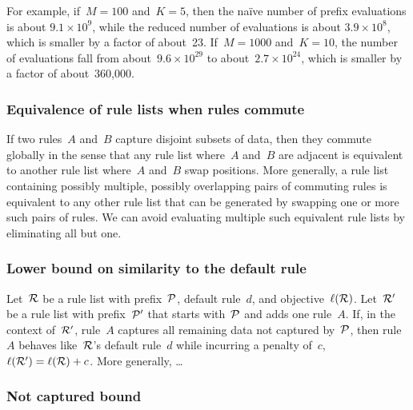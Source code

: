 For example, if~${M = 100}$ and~${K = 5}$, then the na\"ive number of prefix evaluations is
about ${9.1 \times 10^9}$, while the reduced number of evaluations is about ${3.9 \times 10^8}$,
which is smaller by a factor of about~23.
%
If~${M=1000}$ and~${K = 10}$, the number of evaluations fall from
about~${9.6 \times 10^{29}}$ to about~${2.7 \times 10^{24}}$,
which is smaller by a factor of about~360,000.
%

\subsubsection{Equivalence of rule lists when rules commute}

If two rules~$A$ and~$B$ capture disjoint subsets of data,
then they commute globally in the sense that any rule list where~$A$ and~$B$ are
adjacent is equivalent to another rule list where~$A$ and~$B$ swap positions.
%
More generally, a rule list containing possibly multiple, possibly overlapping
pairs of commuting rules is equivalent to any other rule list that can be generated
by swapping one or more such pairs of rules.
%
We can avoid evaluating multiple such equivalent rule lists by eliminating all but one.
%

\subsubsection{Lower bound on similarity to the default rule}

Let~${\mathcal R}$ be a rule list with prefix~${\mathcal P}$, default rule~$d$, and objective~$\ell({\mathcal R})$.
%
Let~${\mathcal R}'$ be a rule list with prefix~${\mathcal P}'$ that starts with~${\mathcal P}$ and adds one rule~$A$.
%
If, in the context of~${\mathcal R}'$, rule~$A$ captures all remaining data not captured by~${\mathcal P}$,
then rule~$A$ behaves like~${\mathcal R}$'s default rule~$d$ while incurring a penalty of~$c$,
\ie ~${\ell({\mathcal R}') = \ell({\mathcal R}) + c}$.
%
%
More generally, \dots
%

\subsubsection{Not captured bound}

